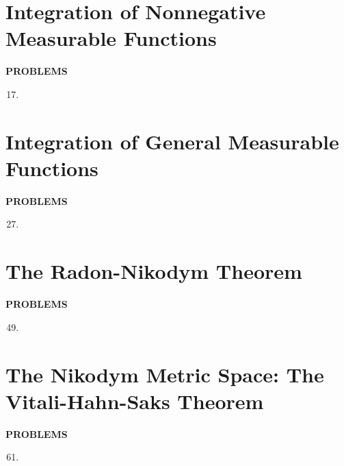 \section{Integration of Nonnegative Measurable Functions}
\begin{center}
	\textbf{PROBLEMS}
\end{center}
\begin{enumerate}
	\setcounter{enumi}{16}
    \item 
\end{enumerate}

\section{Integration of General Measurable Functions}
\begin{center}
	\textbf{PROBLEMS}
\end{center}
\begin{enumerate}
	\setcounter{enumi}{26}
    \item 
\end{enumerate}

\section{The Radon-Nikodym Theorem}
\begin{center}
	\textbf{PROBLEMS}
\end{center}
\begin{enumerate}
	\setcounter{enumi}{48}
    \item 
\end{enumerate}

\section{The Nikodym Metric Space: The Vitali-Hahn-Saks Theorem}
\begin{center}
	\textbf{PROBLEMS}
\end{center}
\begin{enumerate}
	\setcounter{enumi}{60}
    \item 
\end{enumerate}
